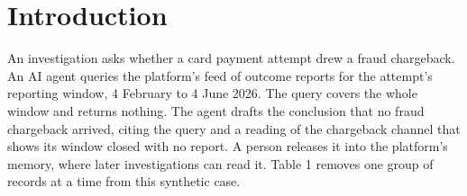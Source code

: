 \documentclass[acmlarge,nonacm]{acmart}
\begin{document}
\hypertarget{introduction}{%
\section{Introduction}\label{introduction}}

An investigation asks whether a card payment attempt drew a fraud
chargeback. An AI agent queries the platform's feed of outcome reports
for the attempt's reporting window, 4 February to 4 June 2026. The query
covers the whole window and returns nothing. The agent drafts the
conclusion that no fraud chargeback arrived, citing the query and a
reading of the chargeback channel that shows its window closed with no
report. A person releases it into the platform's memory, where later
investigations can read it. Table 1 removes one group of records at a
time from this synthetic case.

\begingroup\footnotesize
\end{document}
